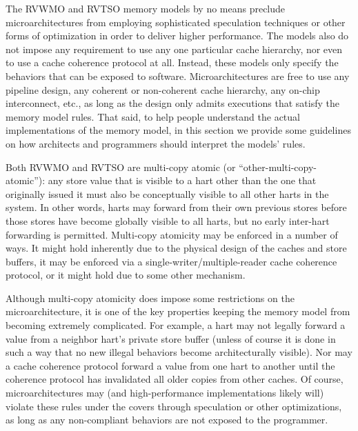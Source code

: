 The RVWMO and RVTSO memory models by no means preclude microarchitectures from employing sophisticated speculation techniques or other forms of optimization in order to deliver higher performance.
The models also do not impose any requirement to use any one particular cache hierarchy, nor even to use a cache coherence protocol at all.
Instead, these models only specify the behaviors that can be exposed to software.
Microarchitectures are free to use any pipeline design, any coherent or non-coherent cache hierarchy, any on-chip interconnect, etc., as long as the design only admits executions that satisfy the memory model rules.
That said, to help people understand the actual implementations of the memory model, in this section we provide some guidelines on how architects and programmers should interpret the models' rules.

Both RVWMO and RVTSO are multi-copy atomic (or ``other-multi-copy-atomic''): any store value that is visible to a hart other than the one that originally issued it must also be conceptually visible to all other harts in the system.
In other words, harts may forward from their own previous stores before those stores have become globally visible to all harts, but no early inter-hart forwarding is permitted.
Multi-copy atomicity may be enforced in a number of ways.
It might hold inherently due to the physical design of the caches and store buffers, it may be enforced via a single-writer/multiple-reader cache coherence protocol, or it might hold due to some other mechanism.

Although multi-copy atomicity does impose some restrictions on the microarchitecture, it is one of the key properties keeping the memory model from becoming extremely complicated.
For example, a hart may not legally forward a value from a neighbor hart's private store buffer (unless of course it is done in such a way that no new illegal behaviors become architecturally visible).
Nor may a cache coherence protocol forward a value from one hart to another until the coherence protocol has invalidated all older copies from other caches.
Of course, microarchitectures may (and high-performance implementations likely will) violate these rules under the covers through speculation or other optimizations, as long as any non-compliant behaviors are not exposed to the programmer.

